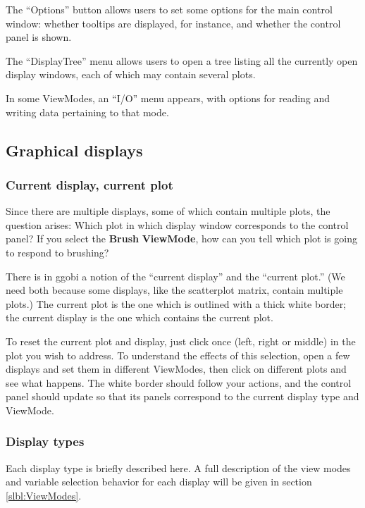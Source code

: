 \documentclass[11pt]{article}
\begin{document}
The ``Options'' button allows users to set some options for the
main control window:  whether tooltips are displayed, for instance,
and whether the control panel is shown.

The ``DisplayTree'' menu allows users to open a tree listing
all the currently open display windows, each of which may contain
several plots.

In some ViewModes, an ``I/O'' menu appears, with options for
reading and writing data pertaining to that mode.

\subsection{Graphical displays}
\label{slbl:GraphicalDisplays}

\subsubsection{Current display, current plot}

Since there are multiple displays, some of which contain multiple
plots, the question arises:  Which plot in which display window
corresponds to the control panel?  If you select the {\bf Brush} {\bf
ViewMode}, how can you tell which plot is going to respond to
brushing?

There is in ggobi a notion of the ``current display'' and the
``current plot.''  (We need both because some displays, like the
scatterplot matrix, contain multiple plots.) The current plot is the
one which is outlined with a thick white border; the current display
is the one which contains the current plot.

To reset the current plot and display, just click once (left, right
or middle) in the plot you wish to address.  To understand the
effects of this selection, open a few displays and set them in
different ViewModes, then click on different plots and see what
happens.  The white border should follow your actions, and the
control panel should update so that its panels correspond to the
current display type and ViewMode.

\subsubsection{Display types}

Each display type is briefly described here.  A full description of the
view modes and variable selection behavior for each display will be
given in section \ref{slbl:ViewModes}.
\end{document}
